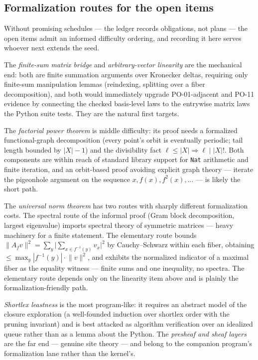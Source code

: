 \subsection{Formalization routes for the open items}

Without promising schedules --- the ledger records obligations, not
plans --- the open items admit an informed difficulty ordering, and
recording it here serves whoever next extends the seed.

The \emph{finite-sum matrix bridge} and \emph{arbitrary-vector
linearity} are the mechanical end: both are finite summation
arguments over Kronecker deltas, requiring only finite-sum
manipulation lemmas (reindexing, splitting over a fiber
decomposition), and both would immediately upgrade PO-01-adjacent and
PO-11 evidence by connecting the checked basis-level laws to the
entrywise matrix laws the Python suite tests. They are the natural
first targets.

The \emph{factorial power theorem} is middle difficulty: its proof
needs a formalized functional-graph decomposition (every point's
orbit is eventually periodic; tail length bounded by $|X| - 1$) and
the divisibility fact $\ell \le |X| \Rightarrow \ell \mid |X|!$. Both
components are within reach of standard library support for
\texttt{Nat} arithmetic and finite iteration, and an orbit-based
proof avoiding explicit graph theory --- iterate the pigeonhole
argument on the sequence $x, f(x), f^2(x), \dots$ --- is likely the
short path.

The \emph{universal norm theorem} has two routes with sharply
different formalization costs. The spectral route of the informal
proof (Gram block decomposition, largest eigenvalue) imports spectral
theory of symmetric matrices --- heavy machinery for a finite
statement. The elementary route bounds
$\lVert A_f v \rVert^2 = \sum_y \bigl|\sum_{x \in f^{-1}(y)} v_x\bigr|^2$
by Cauchy--Schwarz within each fiber, obtaining
$\le \max_y |f^{-1}(y)| \cdot \lVert v \rVert^2$, and exhibits the
normalized indicator of a maximal fiber as the equality witness ---
finite sums and one inequality, no spectra. The elementary route
depends only on the linearity item above and is plainly the
formalization-friendly path.

\emph{Shortlex leastness} is the most program-like: it requires an
abstract model of the closure exploration (a well-founded induction
over shortlex order with the pruning invariant) and is best attacked
as algorithm verification over an idealized queue rather than as a
lemma about the Python. The \emph{presheaf and sheaf layers} are the
far end --- genuine site theory --- and belong to the companion
program's formalization lane rather than the kernel's.

